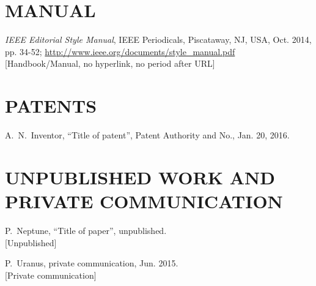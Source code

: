 \documentclass[a4paper,
              ]{jacow}
\begin{document}
\newpage

\section{MANUAL}

\begin{thebibliography}{99} %
	\setcounter{enumi}{16}
		\emph{IEEE Editorial Style Manual}, 
		IEEE Periodicals, 
		Piscataway, NJ, USA, Oct. 2014, pp. 34-52; 
		\url{http://www.ieee.org/documents/style_manual.pdf} \\
	\textcolor{jmanu}{[Handbook/Manual, no hyperlink, no period after URL]}
\end{thebibliography}

\section{PATENTS}

\begin{thebibliography}{99} %
	\setcounter{enumi}{17}
		A.~N.~Inventor, 
		“Title of patent”, 
		Patent Authority and No., Jan. 20, 2016.

\end{thebibliography}

\newpage

\section{UNPUBLISHED WORK AND PRIVATE COMMUNICATION}

\begin{thebibliography}{99} %
	\setcounter{enumi}{18}
		P.~Neptune, “Title of paper”, unpublished.\\
	\textcolor{junpu}{[Unpublished]}
	
	P.~Uranus, private communication, Jun. 2015.\\
	\textcolor{junpu}{[Private communication]}

\end{thebibliography}
\null  %

\newpage

\end{document}
